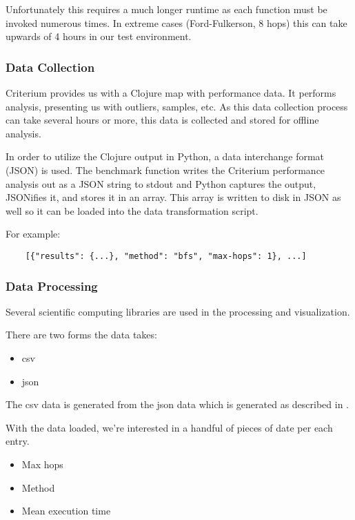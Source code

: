 			Unfortunately this requires a much longer runtime as each function must be invoked numerous times.	In extreme cases (Ford-Fulkerson, 8 hops) this can take upwards of 4 hours in our test environment.
		
			\subsubsection{Data Collection}
			\label{sec:data-collection}
				Criterium provides us with a Clojure map with performance data.	 It performs analysis, presenting us with outliers, samples, etc.  As this data collection process can take several hours or more, this data is collected and stored for offline analysis.
				
				In order to utilize the Clojure output in Python, a data interchange format (JSON) is used.	 The benchmark function writes the Criterium performance analysis out as a JSON string to stdout and Python captures the output, JSONifies it, and stores it in an array.  This array is written to disk in JSON as well so it can be loaded into the data transformation script.
				
				For example:
				
				\begin{verbatim}
	[{"results": {...}, "method": "bfs", "max-hops": 1}, ...]
				\end{verbatim}
			
			\subsubsection{Data Processing}
			\label{sec:data-processing}
				Several scientific computing libraries are used in the processing and visualization.
				
				There are two forms the data takes:
				
				\begin{itemize}
					\item \gls{csv}
					\item \gls{json}
				\end{itemize}
				
				The \gls{csv} data is generated from the \gls{json} data which is generated as described in .
				
				With the data loaded, we're interested in a handful of pieces of date per each entry.
				
				\begin{itemize}
					\item Max hops
					\item Method
					\item Mean execution time
				\end{itemize}
				
